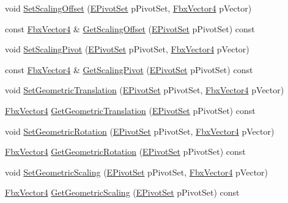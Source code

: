 \begin{DoxyCompactItemize}
\item 
void \hyperlink{class_fbx_node_ac4d24834873de9d73785794d4268441c}{Set\+Scaling\+Offset} (\hyperlink{class_fbx_node_ae62b7311ac4727654cdf1ebd5cbf7343}{E\+Pivot\+Set} p\+Pivot\+Set, \hyperlink{class_fbx_vector4}{Fbx\+Vector4} p\+Vector)
\item 
const \hyperlink{class_fbx_vector4}{Fbx\+Vector4} \& \hyperlink{class_fbx_node_a197fdb9f603ee206707abf56c225d077}{Get\+Scaling\+Offset} (\hyperlink{class_fbx_node_ae62b7311ac4727654cdf1ebd5cbf7343}{E\+Pivot\+Set} p\+Pivot\+Set) const
\item 
void \hyperlink{class_fbx_node_a461d9d65ccd7ca051dbc85e56e9d672e}{Set\+Scaling\+Pivot} (\hyperlink{class_fbx_node_ae62b7311ac4727654cdf1ebd5cbf7343}{E\+Pivot\+Set} p\+Pivot\+Set, \hyperlink{class_fbx_vector4}{Fbx\+Vector4} p\+Vector)
\item 
const \hyperlink{class_fbx_vector4}{Fbx\+Vector4} \& \hyperlink{class_fbx_node_a9ced11788befa42e2ca710e0f7543784}{Get\+Scaling\+Pivot} (\hyperlink{class_fbx_node_ae62b7311ac4727654cdf1ebd5cbf7343}{E\+Pivot\+Set} p\+Pivot\+Set) const
\item 
void \hyperlink{class_fbx_node_a5aaf6f4c2b4ffcd1b483d84453634e79}{Set\+Geometric\+Translation} (\hyperlink{class_fbx_node_ae62b7311ac4727654cdf1ebd5cbf7343}{E\+Pivot\+Set} p\+Pivot\+Set, \hyperlink{class_fbx_vector4}{Fbx\+Vector4} p\+Vector)
\item 
\hyperlink{class_fbx_vector4}{Fbx\+Vector4} \hyperlink{class_fbx_node_a28af23771e1224b0e8a175e67f4f27f9}{Get\+Geometric\+Translation} (\hyperlink{class_fbx_node_ae62b7311ac4727654cdf1ebd5cbf7343}{E\+Pivot\+Set} p\+Pivot\+Set) const
\item 
void \hyperlink{class_fbx_node_a4062b953d36a933a0022343b20f8b522}{Set\+Geometric\+Rotation} (\hyperlink{class_fbx_node_ae62b7311ac4727654cdf1ebd5cbf7343}{E\+Pivot\+Set} p\+Pivot\+Set, \hyperlink{class_fbx_vector4}{Fbx\+Vector4} p\+Vector)
\item 
\hyperlink{class_fbx_vector4}{Fbx\+Vector4} \hyperlink{class_fbx_node_a36fc6c0ae9d18e3b492f7b87d6146cea}{Get\+Geometric\+Rotation} (\hyperlink{class_fbx_node_ae62b7311ac4727654cdf1ebd5cbf7343}{E\+Pivot\+Set} p\+Pivot\+Set) const
\item 
void \hyperlink{class_fbx_node_aa03076ed567455b364d4fd088fc00fd0}{Set\+Geometric\+Scaling} (\hyperlink{class_fbx_node_ae62b7311ac4727654cdf1ebd5cbf7343}{E\+Pivot\+Set} p\+Pivot\+Set, \hyperlink{class_fbx_vector4}{Fbx\+Vector4} p\+Vector)
\item 
\hyperlink{class_fbx_vector4}{Fbx\+Vector4} \hyperlink{class_fbx_node_acb9a52f8757948a3128d6813654bc99a}{Get\+Geometric\+Scaling} (\hyperlink{class_fbx_node_ae62b7311ac4727654cdf1ebd5cbf7343}{E\+Pivot\+Set} p\+Pivot\+Set) const

\end{DoxyCompactItemize}

